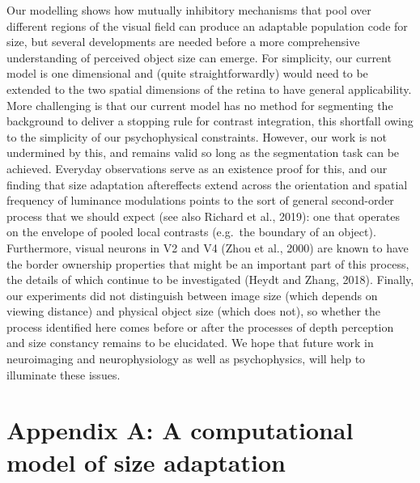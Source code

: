 \documentclass[
]{article}
\begin{document}
Our modelling shows how mutually inhibitory mechanisms that pool over different regions of the visual field can produce an adaptable population code for size, but several developments are needed before a more comprehensive understanding of perceived object size can emerge. For simplicity, our current model is one dimensional and (quite straightforwardly) would need to be extended to the two spatial dimensions of the retina to have general applicability. More challenging is that our current model has no method for segmenting the background to deliver a stopping rule for contrast integration, this shortfall owing to the simplicity of our psychophysical constraints. However, our work is not undermined by this, and remains valid so long as the segmentation task can be achieved. Everyday observations serve as an existence proof for this, and our finding that size adaptation aftereffects extend across the orientation and spatial frequency of luminance modulations points to the sort of general second-order process that we should expect (see also Richard et al., 2019): one that operates on the envelope of pooled local contrasts (e.g.~the boundary of an object). Furthermore, visual neurons in V2 and V4 (Zhou et al., 2000) are known to have the border ownership properties that might be an important part of this process, the details of which continue to be investigated (Heydt and Zhang, 2018). Finally, our experiments did not distinguish between image size (which depends on viewing distance) and physical object size (which does not), so whether the process identified here comes before or after the processes of depth perception and size constancy remains to be elucidated. We hope that future work in neuroimaging and neurophysiology as well as psychophysics, will help to illuminate these issues.

\hypertarget{appendix-a-a-computational-model-of-size-adaptation}{%
\section*{Appendix A: A computational model of size adaptation}\label{appendix-a-a-computational-model-of-size-adaptation}}
\end{document}
